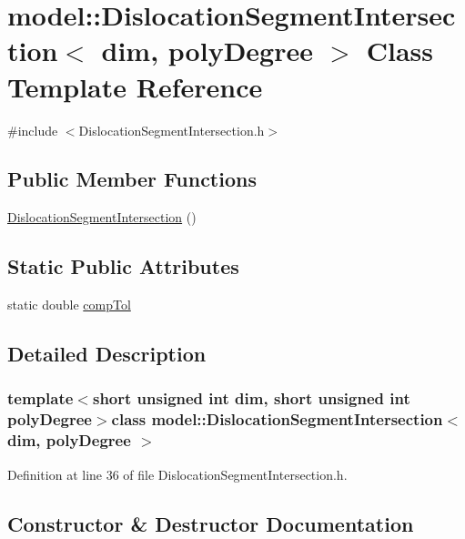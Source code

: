 \hypertarget{classmodel_1_1_dislocation_segment_intersection}{}\section{model\+:\+:Dislocation\+Segment\+Intersection$<$ dim, poly\+Degree $>$ Class Template Reference}
\label{classmodel_1_1_dislocation_segment_intersection}


{\ttfamily \#include $<$Dislocation\+Segment\+Intersection.\+h$>$}

\subsection*{Public Member Functions}
\begin{DoxyCompactItemize}
\item 
\hyperlink{classmodel_1_1_dislocation_segment_intersection_a24c7bfe6b7b97f018a9b42f391a5f092}{Dislocation\+Segment\+Intersection} ()
\end{DoxyCompactItemize}
\subsection*{Static Public Attributes}
\begin{DoxyCompactItemize}
\item 
static double \hyperlink{classmodel_1_1_dislocation_segment_intersection_ae3d440e7a741f0f822a661ebb00eb70f}{comp\+Tol}
\end{DoxyCompactItemize}


\subsection{Detailed Description}
\subsubsection*{template$<$short unsigned int dim, short unsigned int poly\+Degree$>$class model\+::\+Dislocation\+Segment\+Intersection$<$ dim, poly\+Degree $>$}



Definition at line 36 of file Dislocation\+Segment\+Intersection.\+h.



\subsection{Constructor \& Destructor Documentation}
\hypertarget{classmodel_1_1_dislocation_segment_intersection_a24c7bfe6b7b97f018a9b42f391a5f092}{}
